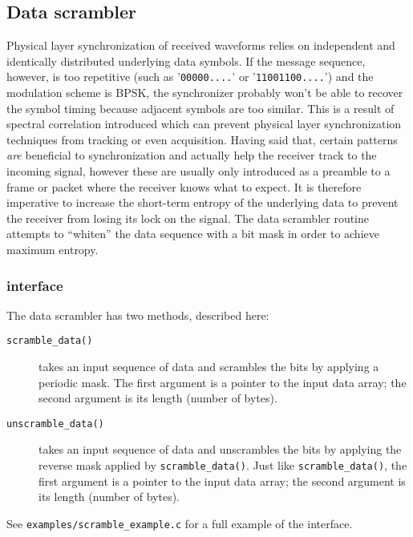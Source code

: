 % 
%
\subsection{Data scrambler}
\label{module:random:data_scrambler}
Physical layer synchronization of received waveforms relies on independent and
identically distributed underlying data symbols.
If the message sequence, however, is too repetitive
(such as '{\tt 00000....}' or '{\tt 11001100....}')
and the modulation scheme is BPSK, the synchronizer probably won't be able to
recover the symbol timing because adjacent symbols are too similar.
This is a result of spectral correlation introduced which can prevent physical
layer synchronization techniques from tracking or even acquisition.
Having said that, certain patterns {\em are} beneficial to synchronization and
actually help the receiver track to the incoming signal, however these are
usually only introduced as a preamble to a frame or packet where the receiver
knows what to expect.
It is therefore imperative to increase the short-term entropy of the
underlying data to prevent the receiver from losing its lock on the signal.
The data scrambler routine attempts to ``whiten'' the data sequence with a bit
mask in order to achieve maximum entropy.

\subsubsection{interface}
The data scrambler has two methods, described here:
\begin{description}
\item[{\tt scramble\_data()}]
    takes an input sequence of data and scrambles the bits by applying a
    periodic mask.
    The first argument is a pointer to the input data array; the second
    argument is its length (number of bytes).
\item[{\tt unscramble\_data()}]
    takes an input sequence of data and unscrambles the bits by applying the
    reverse mask applied by {\tt scramble\_data()}.
    Just like {\tt scramble\_data()}, the first argument is a pointer to the
    input data array; the second argument is its length (number of bytes).
\end{description}

See {\tt examples/scramble\_example.c} for a full example of the interface.


